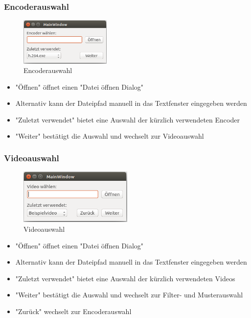 \documentclass[parskip=full]{scrartcl}
\begin{document}
\subsubsection{Encoderauswahl}
\begin{figure}[htbp] 
\centering
\includegraphics[width=0.4\textwidth]{GUI_Entwurf_1/GUI_1.png}
\caption{Encoderauswahl}
\end{figure}
\begin{itemize}
\item "Öffnen" öffnet einen "Datei öffnen Dialog"
\item Alternativ kann der Dateipfad manuell in das Textfenster eingegeben werden
\item "Zuletzt verwendet" bietet eine Auswahl der kürzlich verwendeten Encoder
\item "Weiter" bestätigt die Auswahl und wechselt zur Videoauswahl
\end{itemize}
\subsubsection{Videoauswahl}
\begin{figure}[htbp] 
\centering
\includegraphics[width=0.5\textwidth]{GUI_Entwurf_1/GUI_2.png}
\caption{Videoauswahl}
\end{figure}
\begin{itemize}
\item "Öffnen" öffnet einen "Datei öffnen Dialog"
\item Alternativ kann der Dateipfad manuell in das Textfenster eingegeben werden
\item "Zuletzt verwendet" bietet eine Auswahl der kürzlich verwendeten Videos
\item "Weiter" bestätigt die Auswahl und wechselt zur Filter- und Musterauswahl
\item "Zurück" wechselt zur Encoderauswahl
\end{itemize}
\end{document}

